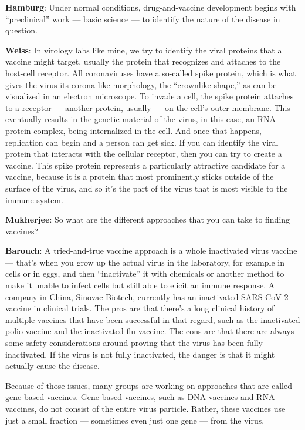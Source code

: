 \textbf{Hamburg}: Under normal conditions, drug-and-vaccine development
begins with ``preclinical'' work --- basic science --- to identify the
nature of the disease in question.

\textbf{Weiss}: In virology labs like mine, we try to identify the viral
proteins that a vaccine might target, usually the protein that
recognizes and attaches to the host-cell receptor. All coronaviruses
have a so-called spike protein, which is what gives the virus its
corona-like morphology, the ``crownlike shape,'' as can be visualized in
an electron microscope. To invade a cell, the spike protein attaches to
a receptor --- another protein, usually --- on the cell's outer
membrane. This eventually results in the genetic material of the virus,
in this case, an RNA protein complex, being internalized in the cell.
And once that happens, replication can begin and a person can get sick.
If you can identify the viral protein that interacts with the cellular
receptor, then you can try to create a vaccine. This spike protein
represents a particularly attractive candidate for a vaccine, because it
is a protein that most prominently sticks outside of the surface of the
virus, and so it's the part of the virus that is most visible to the
immune system.

\textbf{Mukherjee}: So what are the different approaches that you can
take to finding vaccines?

\textbf{Barouch}: A tried-and-true vaccine approach is a whole
inactivated virus vaccine --- that's when you grow up the actual virus
in the laboratory, for example in cells or in eggs, and then
``inactivate'' it with chemicals or another method to make it unable to
infect cells but still able to elicit an immune response. A company in
China, Sinovac Biotech, currently has an inactivated SARS-CoV-2 vaccine
in clinical trials. The pros are that there's a long clinical history of
multiple vaccines that have been successful in that regard, such as the
inactivated polio vaccine and the inactivated flu vaccine. The cons are
that there are always some safety considerations around proving that the
virus has been fully inactivated. If the virus is not fully inactivated,
the danger is that it might actually cause the disease.

Because of those issues, many groups are working on approaches that are
called gene-based vaccines. Gene-based vaccines, such as DNA vaccines
and RNA vaccines, do not consist of the entire virus particle. Rather,
these vaccines use just a small fraction --- sometimes even just one
gene --- from the virus.

